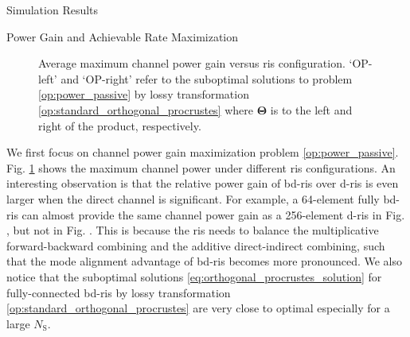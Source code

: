 \begin{section}{Simulation Results}
 \begin{subsection}{Power Gain and Achievable Rate Maximization}
	 \begin{figure}[!t]
		 \centering
		 \caption{
			 Average maximum channel power gain versus \gls{ris} configuration.
			 `OP-left' and `OP-right' refer to the suboptimal solutions to problem \eqref{op:power_passive} by lossy transformation \eqref{op:standard_orthogonal_procrustes} where $\mathbf{\Theta}$ is to the left and right of the product, respectively.
		 }
		 \label{fg:power_sx}
	 \end{figure}

	 We first focus on channel power gain maximization problem \eqref{op:power_passive}.
	 Fig. \ref{fg:power_sx} shows the maximum channel power under different \gls{ris} configurations.
	 An interesting observation is that the relative power gain of \gls{bd}-\gls{ris} over \gls{d}-\gls{ris} is even larger when the direct channel is significant.
	 For example, a 64-element fully \gls{bd}-\gls{ris} can almost provide the same channel power gain as a 256-element \gls{d}-\gls{ris} in Fig. , but not in Fig. .
	 This is because the \gls{ris} needs to balance the multiplicative forward-backward combining and the additive direct-indirect combining, such that the mode alignment advantage of \gls{bd}-\gls{ris} becomes more pronounced.
	 We also notice that the suboptimal solutions \eqref{eq:orthogonal_procrustes_solution} for fully-connected \gls{bd}-\gls{ris} by lossy transformation \eqref{op:standard_orthogonal_procrustes} are very close to optimal especially for a large $N_\mathrm{S}$.


\end{subsection}
\end{section}
